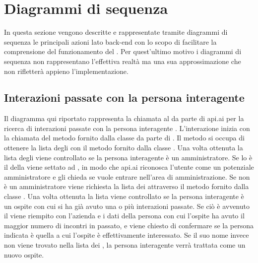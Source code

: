 \section{Diagrammi di sequenza}\label{sequenza}
In questa sezione vengono descritte e rappresentate tramite diagrammi di sequenza  le principali azioni lato back-end con lo scopo di facilitare la comprensione del funzionamento del . Per quest'ultimo motivo i diagrammi di sequenza non rappresentano l'effettiva realtà ma una sua approssimazione che non rifletterà appieno l'implementazione.
\subsection{Interazioni passate con la persona interagente}
Il diagramma qui riportato rappresenta la chiamata al  da parte di api.ai per la ricerca di interazioni passate con la persona interagente . L'interazione inizia con la chiamata del metodo  fornito dalla classe  da parte di . Il metodo si occupa di ottenere la lista degli  con il metodo  fornito dalla classe . Una volta ottenuta la lista degli  viene controllato se la persona interagente è un amministratore. Se lo è il  della  viene settato ad , in modo che api.ai riconosca l'utente come un potenziale amministratore e gli chieda se vuole entrare nell'area di amministrazione. Se non è un amministratore viene richiesta la lista dei  attraverso il metodo  fornito dalla classe . Una volta ottenuta la lista viene controllato se la persona interagente è un ospite con cui si ha già avuto una o più interazioni passate. Se ciò è avvenuto il  viene riempito con l'azienda e i dati della persona con cui l'ospite ha avuto il maggior numero di incontri in passato, e viene chiesto di confermare se la persona indicata è quella a cui l'ospite è effettivamente interessato. Se il suo nome invece non viene trovato nella lista dei , la persona interagente verrà trattata come un nuovo ospite.
